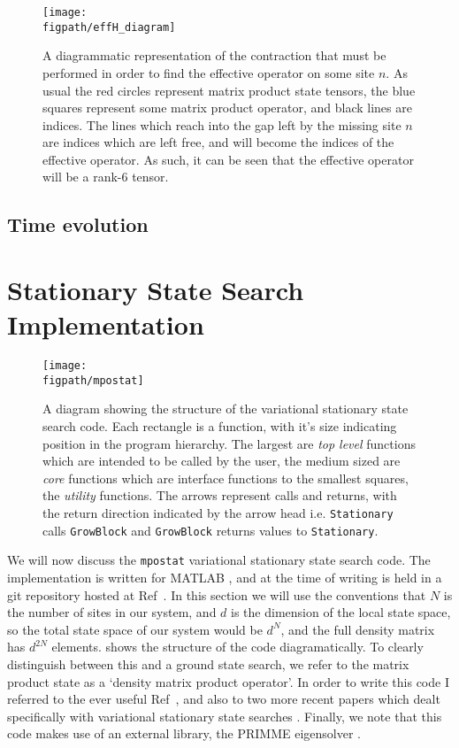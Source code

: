 \begin{figure}[ht!]
\centering
\texttt{[image: \\figpath/effH\_diagram]}
\caption{A diagrammatic representation of the contraction that must be performed in order to find the effective operator on some site \(n\). As usual the red circles represent matrix product state tensors, the blue squares represent some matrix product operator, and black lines are indices. The lines which reach into the gap left by the missing site \(n\) are indices which are left free, and will become the indices of the effective operator. As such, it can be seen that the effective operator will be a rank-6 tensor.}
\label{fig:vs1-3}
\end{figure}

\subsection{Time evolution}

 
\FloatBarrier 
 
 \section{Stationary State Search Implementation}
 
 \begin{figure}[ht!]
 \centering
 \texttt{[image: \\figpath/mpostat]}
 \caption{A diagram showing the structure of the variational stationary state search code. Each rectangle is a function, with it's size indicating position in the program hierarchy. The largest are \emph{top level} functions which are intended to be called by the user, the medium sized are \emph{core} functions which are interface functions to the smallest squares, the \emph{utility} functions. The arrows represent calls and returns, with the return direction indicated by the arrow head i.e. \lstinline$Stationary$ calls \lstinline$GrowBlock$ and \lstinline$GrowBlock$ returns values to \lstinline$Stationary$. }
 \label{fig:vs2-2}
 \end{figure} 
 
 We will now discuss the \lstinline$mpostat$ variational stationary state search code. The implementation is written for MATLAB \cite{MATLAB}, and at the time of writing is held in a git repository hosted at Ref~\cite{otb:gitVSSS}. In this section we will use the conventions that \(N\) is the number of sites in our system, and \(d\) is the dimension of the local state space, so the total state space of our system would be \(d^{N}\), and the full density matrix has \(d^{2N}\) elements.  shows the structure of the code diagramatically. To clearly distinguish between this and a ground state search, we refer to the matrix product state as a `density matrix product operator'. In order to write this code I referred to the ever useful Ref~\cite{Schollwoeck11}, and also to two more recent papers which dealt specifically with variational stationary state searches \cite{CCB15,MFS15}. Finally, we note that this code makes use of an external library, the PRIMME eigensolver \cite{SM10,WRS16}.
 

